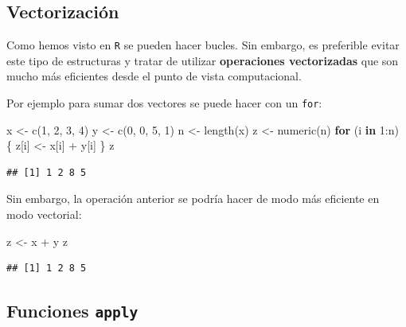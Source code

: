 \documentclass[
]{book}
\newenvironment{Shaded}{\begin{snugshade}}{\end{snugshade}}
\newcommand{\ControlFlowTok}[1]{\textcolor[rgb]{0.13,0.29,0.53}{\textbf{#1}}}
\newcommand{\DecValTok}[1]{\textcolor[rgb]{0.00,0.00,0.81}{#1}}
\newcommand{\FunctionTok}[1]{\textcolor[rgb]{0.00,0.00,0.00}{#1}}
\newcommand{\NormalTok}[1]{#1}
\newcommand{\OtherTok}[1]{\textcolor[rgb]{0.56,0.35,0.01}{#1}}
\newcommand{\SpecialCharTok}[1]{\textcolor[rgb]{0.00,0.00,0.00}{#1}}
\theoremstyle{break}
\theoremstyle{nonumberplain}
\begin{document}
\hypertarget{vectorizaciuxf3n}{%
\subsection{Vectorización}\label{vectorizaciuxf3n}}

Como hemos visto en \texttt{R} se pueden
hacer bucles. Sin embargo, es preferible evitar este tipo de estructuras
y tratar de utilizar \textbf{operaciones vectorizadas} que son mucho más
eficientes desde el punto de vista computacional.

Por ejemplo para sumar dos vectores se puede hacer con un \texttt{for}:

\begin{Shaded}
\begin{Highlighting}[]
\NormalTok{x }\OtherTok{\textless{}{-}} \FunctionTok{c}\NormalTok{(}\DecValTok{1}\NormalTok{, }\DecValTok{2}\NormalTok{, }\DecValTok{3}\NormalTok{, }\DecValTok{4}\NormalTok{)}
\NormalTok{y }\OtherTok{\textless{}{-}} \FunctionTok{c}\NormalTok{(}\DecValTok{0}\NormalTok{, }\DecValTok{0}\NormalTok{, }\DecValTok{5}\NormalTok{, }\DecValTok{1}\NormalTok{)}
\NormalTok{n }\OtherTok{\textless{}{-}} \FunctionTok{length}\NormalTok{(x)}
\NormalTok{z }\OtherTok{\textless{}{-}} \FunctionTok{numeric}\NormalTok{(n)}
\ControlFlowTok{for}\NormalTok{ (i }\ControlFlowTok{in} \DecValTok{1}\SpecialCharTok{:}\NormalTok{n) \{}
\NormalTok{  z[i] }\OtherTok{\textless{}{-}}\NormalTok{ x[i] }\SpecialCharTok{+}\NormalTok{ y[i]}
\NormalTok{\}}
\NormalTok{z}
\end{Highlighting}
\end{Shaded}

\begin{verbatim}
## [1] 1 2 8 5
\end{verbatim}

Sin embargo, la operación anterior se podría hacer de modo más eficiente
en modo vectorial:

\begin{Shaded}
\begin{Highlighting}[]
\NormalTok{z }\OtherTok{\textless{}{-}}\NormalTok{ x }\SpecialCharTok{+}\NormalTok{ y}
\NormalTok{z}
\end{Highlighting}
\end{Shaded}

\begin{verbatim}
## [1] 1 2 8 5
\end{verbatim}

\hypertarget{funciones-apply}{%
\subsection{\texorpdfstring{Funciones \texttt{apply}}{Funciones apply}}\label{funciones-apply}}
\end{document}
